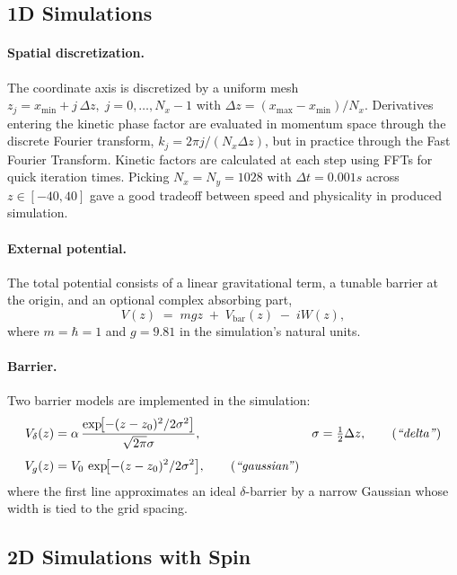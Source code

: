 \subsection{1D Simulations}

\paragraph{Spatial discretization.}
The coordinate axis is discretized by a uniform mesh $ z_j = x_{\min}+j\,\Delta z,\; j=0,\dots,N_x-1$ with \(\Delta z=(x_{\max}-x_{\min})/N_x\). Derivatives entering the kinetic phase factor are evaluated in momentum space through the discrete Fourier transform, \(k_j = 2\pi j /(N_x\Delta z)\), but in practice through the Fast Fourier Transform. Kinetic factors are calculated at each step using FFTs for quick iteration times. Picking $N_x=N_y=1028$ with $\Delta t = 0.001s$ across $z \in [-40,40]$ gave a good tradeoff between speed and physicality in produced simulation.
\paragraph{External potential.}
The total potential consists of a linear gravitational term, a tunable barrier at the origin, and an optional complex absorbing part,  
\begin{equation}
    V(z) \;=\; mgz\;+\;V_{\text{bar}}(z)\;-\;iW(z),
\end{equation}
where \(m=\hbar=1\) and $g=9.81$ in the simulation’s natural units.

\paragraph{Barrier.}  
  Two barrier models are implemented in the simulation:
  \begin{align}
      V_\delta(z) &= \alpha\,
      \frac{\exp\!\bigl[-(z-z_0)^2/2\sigma^2\bigr]}
           {\sqrt{2\pi}\sigma},
      &&\sigma=\tfrac12\Delta z,\tag{\textit{``delta''}}\\[4pt]
      V_g(z)      &= V_0\,
      \exp\!\bigl[-(z-z_0)^2/2\sigma^2\bigr],\tag{\textit{``gaussian''}}
  \end{align}
  where the first line approximates an ideal \(\delta\)-barrier by a narrow Gaussian whose width is tied to the grid spacing.

\subsection{2D Simulations with Spin}

